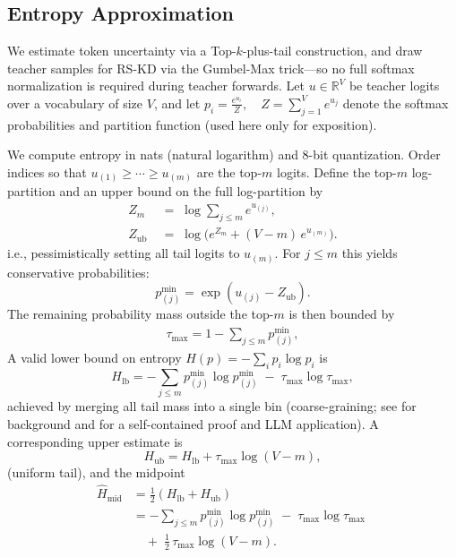 \documentclass[11pt]{article}
\begin{document}
\subsection{Entropy Approximation}
\label{sec:entropy}
We estimate token uncertainty via a Top-$k$-plus-tail construction, and draw teacher samples for RS-KD via the Gumbel-Max trick---so no full softmax normalization is required during teacher forwards.
Let $u \in \mathbb{R}^V$ be teacher logits over a vocabulary of size $V$, and let
$
	p_i=\frac{e^{u_i}}{Z},\quad Z=\sum_{j=1}^V e^{u_j}
$
denote the softmax probabilities and partition function (used here only for exposition).

We compute entropy in nats (natural logarithm) and 8-bit quantization.
Order indices so that $u_{(1)} \geq \cdots \geq u_{(m)}$ are the top-$m$ logits.
Define the top-$m$ log-partition and an upper bound on the full log-partition by
\begin{align*}
	Z_m \;           & =\; \log \sum_{j \leq m} e^{u_{(j)}},            \\
	Z_{\text{ub}} \; & =\; \log\Big(e^{Z_m} + (V-m)\,e^{u_{(m)}}\Big).
\end{align*}
i.e., pessimistically setting all tail logits to $u_{(m)}$. For $j\le m$ this yields conservative probabilities:
\[
	p^{\min}_{(j)}=\exp(u_{(j)}-Z_{\text{ub}}).
\]
The remaining probability mass outside the top-$m$ is then bounded by
\begin{align*}
	\tau_{\max}=1-\sum_{j\le m}p^{\min}_{(j)},
\end{align*}
A valid lower bound on entropy $H(p)=-\sum_i p_i\log p_i$ is
\[
	H_{\text{lb}}=-\sum_{j\le m} p^{\min}_{(j)}\log p^{\min}_{(j)}\;-\;\tau_{\max}\log\tau_{\max},
\]
achieved by merging all tail mass into a single bin (coarse-graining; see \citep{cover2006elements} for background and \citep[\S3.6]{kaltchenko2025entropyheatmap} for a self-contained proof and LLM application). A corresponding upper estimate is
\[
	H_{\text{ub}}=H_{\text{lb}}+\tau_{\max}\log(V-m),
\]
(uniform tail), and the midpoint
\begin{align*}
	\widehat{H}_{\text{mid}} & =\tfrac12\!\left(H_{\text{lb}}+H_{\text{ub}}\right)                                   \\
	                         & = -\sum_{j\le m}p^{\min}_{(j)}\log p^{\min}_{(j)} \;-\; \tau_{\max}\log\tau_{\max} \; \\
	                         & \quad +\; \tfrac12\,\tau_{\max}\log(V-m).
\end{align*}
\end{document}
